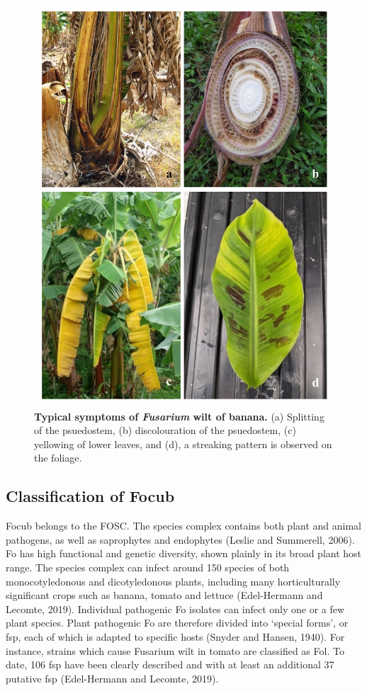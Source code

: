 \begin{figure}[hpt!]
    \centering
    \includegraphics[width=15cm]{Figures/SymptomsofFoc.pdf}
    \caption[Typical symptoms of Fusarium  wilt of banana.]{\textbf{Typical symptoms of \textit{Fusarium} wilt of banana.} (a) Splitting of the psuedostem, (b) discolouration of the psuedostem, (c) yellowing of lower leaves, and (d), a streaking pattern is observed on the foliage.}
    \label{fig:FusariumWiltSymptoms}
\end{figure}

\subsection{Classification of \acl{Focub}}

\ac{Focub} belongs to the \ac{FOSC}. The species complex contains both plant and animal pathogens, as well as saprophytes and endophytes (Leslie and Summerell, 2006). \acs{Fo} has high functional and genetic diversity, shown plainly in its broad plant host range. The species complex can infect around 150 species of both monocotyledonous and dicotyledonous plants, including many horticulturally significant crops such as banana, tomato and lettuce  (Edel-Hermann and Lecomte, 2019).  Individual pathogenic \ac{Fo} isolates can infect only one or a few plant species. Plant pathogenic \ac{Fo} are therefore divided into ‘special forms’, or \ac{fsp}, each of which is adapted to specific hosts (Snyder and Hansen, 1940). For instance, strains which cause Fusarium wilt in tomato are classified as \ac{Fol}. To date, 106 \ac{fsp} have been clearly described and with at least an additional 37 putative \ac{fsp} (Edel-Hermann and Lecomte, 2019).   

